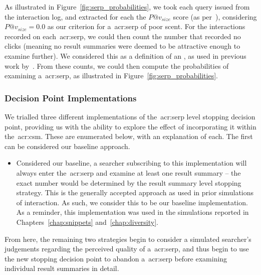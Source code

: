 As illustrated in Figure~\ref{fig:serp_probabilities}, we took each query issued from the interaction log, and extracted for each the $P@v_{size}$ score (as per~\cite{wu2014information_scent}), considering $P@v_{size}=0.0$ as our criterion for a~\gls{acr:serp} of poor scent. For the interactions recorded on each~\gls{acr:serp}, we could then count the number that recorded no clicks (meaning no result summaries were deemed to be attractive enough to examine further). We considered this as a definition of an , as used in previous work by~\cite{hassan2013serp_abandonment}. From these counts, we could then compute the probabilities of examining a~\gls{acr:serp}, as illustrated in Figure~\ref{fig:serp_probabilities}.

\subsubsection{Decision Point Implementations}\label{sec:serp:method:serp_dp:implementations}
We trialled three different implementations of the~\gls{acr:serp} level stopping decision point, providing us with the ability to explore the effect of incorporating it within the~\gls{acr:csm}. These are enumerated below, with an explanation of each. The first can be considered our baseline approach.

\begin{itemize}
    \item{ Considered our baseline, a searcher subscribing to this implementation will always enter the~\gls{acr:serp} and examine at least one result summary -- the exact number would be determined by the result summary level stopping strategy. This is the generally accepted approach as used in prior simulations of interaction. As such, we consider this to be our baseline implementation. As a reminder, this implementation was used in the simulations reported in Chapters~\ref{chap:snippets} and~\ref{chap:diversity}.}
\end{itemize}

From here, the remaining two strategies begin to consider a simulated searcher's judgements regarding the perceived quality of a~\gls{acr:serp}, and thus begin to use the new stopping decision point to abandon a~\gls{acr:serp} before examining individual result summaries in detail.


